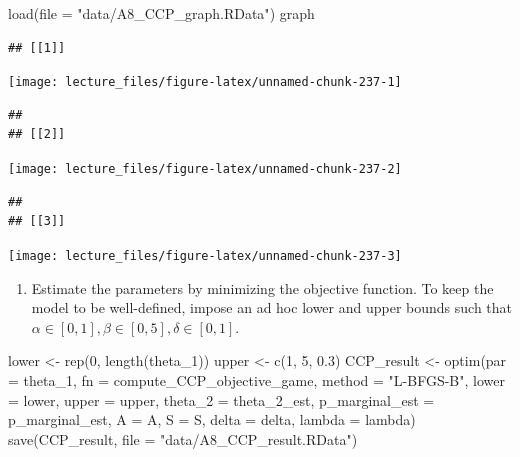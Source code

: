 \documentclass[
]{book}
\newenvironment{Shaded}{\begin{snugshade}}{\end{snugshade}}
\newcommand{\AttributeTok}[1]{\textcolor[rgb]{0.77,0.63,0.00}{#1}}
\newcommand{\DecValTok}[1]{\textcolor[rgb]{0.00,0.00,0.81}{#1}}
\newcommand{\FloatTok}[1]{\textcolor[rgb]{0.00,0.00,0.81}{#1}}
\newcommand{\FunctionTok}[1]{\textcolor[rgb]{0.00,0.00,0.00}{#1}}
\newcommand{\NormalTok}[1]{#1}
\newcommand{\OtherTok}[1]{\textcolor[rgb]{0.56,0.35,0.01}{#1}}
\newcommand{\StringTok}[1]{\textcolor[rgb]{0.31,0.60,0.02}{#1}}
\providecommand{\tightlist}{%
  \setlength{\itemsep}{0pt}\setlength{\parskip}{0pt}}
\begin{document}
\begin{Shaded}
\begin{Highlighting}[]
\FunctionTok{load}\NormalTok{(}\AttributeTok{file =} \StringTok{"data/A8\_CCP\_graph.RData"}\NormalTok{)}
\NormalTok{graph}
\end{Highlighting}
\end{Shaded}

\begin{verbatim}
## [[1]]
\end{verbatim}

\begin{center}\texttt{[image: lecture\_files/figure-latex/unnamed-chunk-237-1]} \end{center}

\begin{verbatim}
## 
## [[2]]
\end{verbatim}

\begin{center}\texttt{[image: lecture\_files/figure-latex/unnamed-chunk-237-2]} \end{center}

\begin{verbatim}
## 
## [[3]]
\end{verbatim}

\begin{center}\texttt{[image: lecture\_files/figure-latex/unnamed-chunk-237-3]} \end{center}

\begin{enumerate}
\def\labelenumi{\arabic{enumi}.}
\setcounter{enumi}{3}
\tightlist
\item
  Estimate the parameters by minimizing the objective function. To keep the model to be well-defined, impose an ad hoc lower and upper bounds such that \(\alpha \in [0, 1], \beta \in [0, 5], \delta \in [0, 1]\).
\end{enumerate}

\begin{Shaded}
\begin{Highlighting}[]
\NormalTok{lower }\OtherTok{\textless{}{-}} \FunctionTok{rep}\NormalTok{(}\DecValTok{0}\NormalTok{, }\FunctionTok{length}\NormalTok{(theta\_1))}
\NormalTok{upper }\OtherTok{\textless{}{-}} \FunctionTok{c}\NormalTok{(}\DecValTok{1}\NormalTok{, }\DecValTok{5}\NormalTok{, }\FloatTok{0.3}\NormalTok{)}
\NormalTok{CCP\_result }\OtherTok{\textless{}{-}}
  \FunctionTok{optim}\NormalTok{(}\AttributeTok{par =}\NormalTok{ theta\_1,}
        \AttributeTok{fn =}\NormalTok{ compute\_CCP\_objective\_game,}
        \AttributeTok{method =} \StringTok{"L{-}BFGS{-}B"}\NormalTok{,}
        \AttributeTok{lower =}\NormalTok{ lower,}
        \AttributeTok{upper =}\NormalTok{ upper,}
        \AttributeTok{theta\_2 =}\NormalTok{ theta\_2\_est,}
        \AttributeTok{p\_marginal\_est =}\NormalTok{ p\_marginal\_est,}
        \AttributeTok{A =}\NormalTok{ A,}
        \AttributeTok{S =}\NormalTok{ S,}
        \AttributeTok{delta =}\NormalTok{ delta,}
        \AttributeTok{lambda =}\NormalTok{ lambda)}
\FunctionTok{save}\NormalTok{(CCP\_result, }\AttributeTok{file =} \StringTok{"data/A8\_CCP\_result.RData"}\NormalTok{)}
\end{Highlighting}
\end{Shaded}
\end{document}
